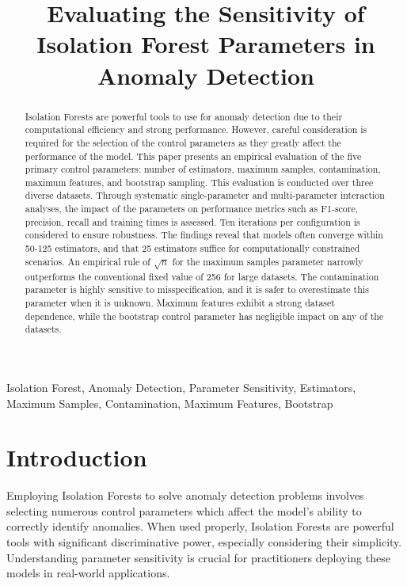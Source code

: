 \documentclass[10pt, conference]{IEEEtran}
\begin{document}
\title{Evaluating the Sensitivity of Isolation Forest Parameters in Anomaly Detection\\

}

\author{
}

\maketitle

\begin{abstract}
Isolation Forests are powerful tools to use for anomaly detection due to their computational efficiency and strong performance. However, careful consideration is required for the selection of the control parameters as they greatly affect the performance of the model. This paper presents an empirical evaluation of the five primary control parameters: number of estimators, maximum samples, contamination, maximum features, and bootstrap sampling. This evaluation is conducted over three diverse datasets. Through systematic single-parameter and multi-parameter interaction analyses, the impact of the parameters on performance metrics such as F1-score, precision, recall and training times is assessed. Ten iterations per configuration is considered to ensure robustness. The findings reveal that models often converge within 50-125 estimators, and that 25 estimators suffice for computationally constrained scenarios. An empirical rule of $\sqrt{n}$ for the maximum samples parameter narrowly outperforms the conventional fixed value of 256 for large datasets. The contamination parameter is highly sensitive to misspecification, and it is safer to overestimate this parameter when it is unknown. Maximum features exhibit a strong dataset dependence, while the bootstrap control parameter has negligible impact on any of the datasets.
\end{abstract}

\begin{IEEEkeywords}
	Isolation Forest, Anomaly Detection, Parameter Sensitivity, Estimators, Maximum Samples, Contamination, Maximum Features, Bootstrap
\end{IEEEkeywords}

\section{Introduction}
Employing Isolation Forests to solve anomaly detection problems involves selecting numerous control parameters which affect the model's ability to correctly identify anomalies. When used properly, Isolation Forests are powerful tools with significant discriminative power, especially considering their simplicity. Understanding parameter sensitivity is crucial for practitioners deploying these models in real-world applications. 
\end{document}

